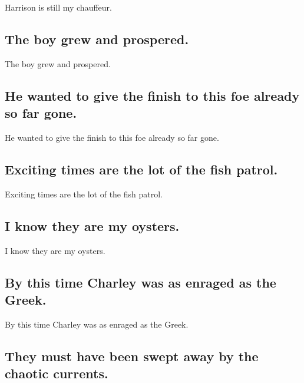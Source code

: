 \documentclass[]{article}
\begin{document}
Harrison is still my chauffeur.

\hypertarget{the-boy-grew-and-prospered.}{%
\subsection{The boy grew and
prospered.}\label{the-boy-grew-and-prospered.}}

The boy grew and prospered.

\hypertarget{he-wanted-to-give-the-finish-to-this-foe-already-so-far-gone.}{%
\subsection{He wanted to give the finish to this foe already so far
gone.}\label{he-wanted-to-give-the-finish-to-this-foe-already-so-far-gone.}}

He wanted to give the finish to this foe already so far gone.

\hypertarget{exciting-times-are-the-lot-of-the-fish-patrol.}{%
\subsection{Exciting times are the lot of the fish
patrol.}\label{exciting-times-are-the-lot-of-the-fish-patrol.}}

Exciting times are the lot of the fish patrol.

\hypertarget{i-know-they-are-my-oysters.}{%
\subsection{I know they are my
oysters.}\label{i-know-they-are-my-oysters.}}

I know they are my oysters.

\hypertarget{by-this-time-charley-was-as-enraged-as-the-greek.}{%
\subsection{By this time Charley was as enraged as the
Greek.}\label{by-this-time-charley-was-as-enraged-as-the-greek.}}

By this time Charley was as enraged as the Greek.

\hypertarget{they-must-have-been-swept-away-by-the-chaotic-currents.}{%
\subsection{They must have been swept away by the chaotic
currents.}\label{they-must-have-been-swept-away-by-the-chaotic-currents.}}
\end{document}
